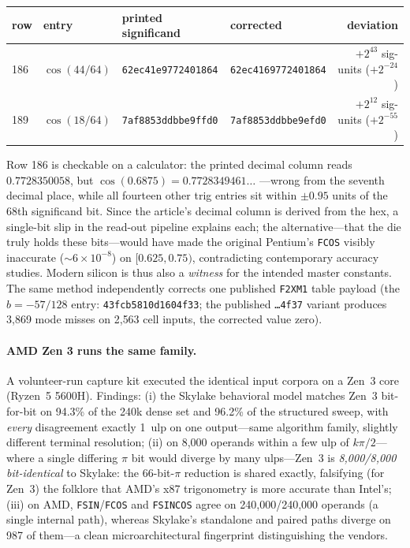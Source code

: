 \documentclass[11pt]{article}
\newcommand{\ulp}{\mathrm{ulp}}
\newcommand{\instr}[1]{\texttt{#1}}
\newcommand{\hex}[1]{\texttt{#1}}
\begin{document}
\begin{center}
\small
\begin{tabular}{llllr}
\toprule
row & entry & printed significand & corrected & deviation\\
\midrule
186 & $\cos(44/64)$ & \hex{62ec41e9772401864} & \hex{62ec4169772401864} & $+2^{43}$ sig-units ($+2^{-24}$)\\
189 & $\cos(18/64)$ & \hex{7af8853ddbbe9ffd0} & \hex{7af8853ddbbe9efd0} & $+2^{12}$ sig-units ($+2^{-55}$)\\
\bottomrule
\end{tabular}
\end{center}

\noindent Row 186 is checkable on a calculator: the printed decimal
column reads $0.7728350058$, but $\cos(0.6875) = 0.7728349461\ldots$
---wrong from the seventh decimal place, while all fourteen other
trig entries sit within $\pm0.95$ units of the 68th significand bit.
Since the article's decimal column is derived from the hex, a
single-bit slip in the read-out pipeline explains each; the
alternative---that the die truly holds these bits---would have made
the original Pentium's \instr{FCOS} visibly inaccurate
(${\sim}6\times10^{-8}$) on $[0.625, 0.75)$, contradicting
contemporary accuracy studies.  Modern silicon is thus also a
\emph{witness} for the intended master constants.  The same method
independently corrects one published \instr{F2XM1} table payload (the
$b = -57/128$ entry: \hex{43fcb5810d1604f33}; the published
\hex{{\ldots}4f37} variant produces 3{,}869 mode misses on 2{,}563
cell inputs, the corrected value zero).

\paragraph{AMD Zen 3 runs the same family.}  A volunteer-run capture
kit executed the identical input corpora on a Zen~3 core (Ryzen~5
5600H).  Findings: (i) the Skylake behavioral model matches Zen~3
bit-for-bit on 94.3\% of the 240k dense set and 96.2\% of the
structured sweep, with \emph{every} disagreement exactly 1~$\ulp$ on
one output---same algorithm family, slightly different terminal
resolution; (ii) on 8{,}000 operands within a few $\ulp$ of
$k\pi/2$---where a single differing $\pi$ bit would diverge by many
$\ulp$s---Zen~3 is \emph{8{,}000/8{,}000 bit-identical} to Skylake:
the 66-bit-$\pi$ reduction is shared exactly, falsifying (for Zen~3)
the folklore that AMD's x87 trigonometry is more accurate than
Intel's; (iii) on AMD, \instr{FSIN}/\instr{FCOS} and \instr{FSINCOS}
agree on 240{,}000/240{,}000 operands (a single internal path),
whereas Skylake's standalone and paired paths diverge on 987 of
them---a clean microarchitectural fingerprint distinguishing the
vendors.
\end{document}
